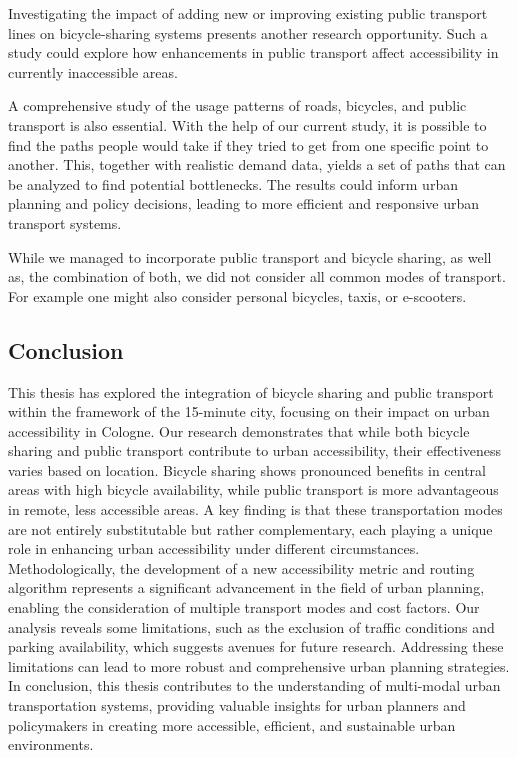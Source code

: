 Investigating the impact of adding new or improving existing public transport lines on bicycle-sharing systems presents another research opportunity. 
Such a study could explore how enhancements in public transport affect accessibility in currently inaccessible areas.

A comprehensive study of the usage patterns of roads, bicycles, and public transport is also essential. 
With the help of our current study, it is possible to find the paths people would take if they tried to get from one specific point to another.
This, together with realistic demand data, yields a set of paths that can be analyzed to find potential bottlenecks.
The results could inform urban planning and policy decisions, leading to more efficient and responsive urban transport systems.

While we managed to incorporate public transport and bicycle sharing, as well as, the combination of both, we did not consider all common modes of transport.
For example one might also consider personal bicycles, taxis, or e-scooters.

\subsection{Conclusion}
\label{sec:conclusion}
This thesis has explored the integration of bicycle sharing and public transport within the framework of the 15-minute city, focusing on their impact on urban accessibility in Cologne.
Our research demonstrates that while both bicycle sharing and public transport contribute to urban accessibility, their effectiveness varies based on location.
Bicycle sharing shows pronounced benefits in central areas with high bicycle availability, while public transport is more advantageous in remote, less accessible areas.
A key finding is that these transportation modes are not entirely substitutable but rather complementary, each playing a unique role in enhancing urban accessibility under different circumstances.
Methodologically, the development of a new accessibility metric and routing algorithm represents a significant advancement in the field of urban planning, enabling the consideration of multiple transport modes and cost factors.
Our analysis reveals some limitations, such as the exclusion of traffic conditions and parking availability, which suggests avenues for future research. Addressing these limitations can lead to more robust and comprehensive urban planning strategies.
In conclusion, this thesis contributes to the understanding of multi-modal urban transportation systems, providing valuable insights for urban planners and policymakers in creating more accessible, efficient, and sustainable urban environments.

